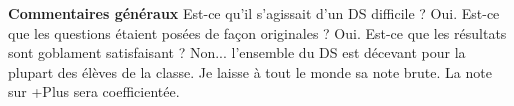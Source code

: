 \documentclass[10pt,fleqn]{article} %
\begin{document}

\pagestyle{fancy}
\thispagestyle{plain}


\def\columnseprulecolor{\color{ocre}}
\setlength{\columnseprule}{0.4pt} 



\vspace{6cm}


\textbf{Commentaires généraux}
Est-ce qu'il s'agissait d'un DS difficile ? Oui. Est-ce que les questions étaient posées de façon originales ? Oui. Est-ce que les résultats sont goblament satisfaisant ? Non... l'ensemble du DS est décevant pour la plupart des élèves de la classe. Je laisse à tout le monde sa note brute. La note sur +Plus sera coefficientée.
\end{document}
